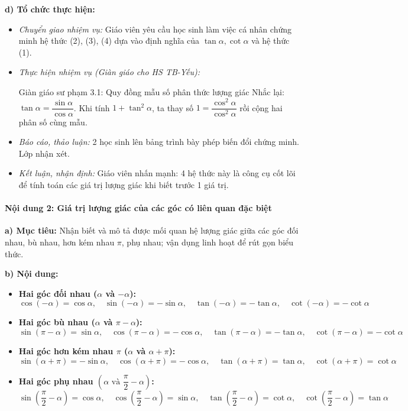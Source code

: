 \documentclass[12pt, a4paper]{article}
\begin{document}
\textbf{d) Tổ chức thực hiện:}
\begin{itemize}[leftmargin=0.6cm]
    \item \textit{Chuyển giao nhiệm vụ:} Giáo viên yêu cầu học sinh làm việc cá nhân chứng minh hệ thức (2), (3), (4) dựa vào định nghĩa của $\tan\alpha, \cot\alpha$ và hệ thức (1).
    \item \textit{Thực hiện nhiệm vụ (Giàn giáo cho HS TB-Yếu):}
    \begin{scaffoldbox}{Giàn giáo sư phạm 3.1: Quy đồng mẫu số phân thức lượng giác}
        Nhắc lại: $\tan\alpha = \dfrac{\sin\alpha}{\cos\alpha}$. Khi tính $1 + \tan^2\alpha$, ta thay số $1 = \dfrac{\cos^2\alpha}{\cos^2\alpha}$ rồi cộng hai phân số cùng mẫu.
    \end{scaffoldbox}
    \item \textit{Báo cáo, thảo luận:} 2 học sinh lên bảng trình bày phép biến đổi chứng minh. Lớp nhận xét.
    \item \textit{Kết luận, nhận định:} Giáo viên nhấn mạnh: 4 hệ thức này là công cụ cốt lõi để tính toán các giá trị lượng giác khi biết trước 1 giá trị.
\end{itemize}

\paragraph{Nội dung 2: Giá trị lượng giác của các góc có liên quan đặc biệt}
\textbf{a) Mục tiêu:} Nhận biết và mô tả được mối quan hệ lượng giác giữa các góc đối nhau, bù nhau, hơn kém nhau $\pi$, phụ nhau; vận dụng linh hoạt để rút gọn biểu thức.

\textbf{b) Nội dung:}
\begin{itemize}[leftmargin=0.6cm]
    \item \textbf{Hai góc đối nhau ($\alpha$ và $-\alpha$):}
    $$\cos(-\alpha) = \cos\alpha, \quad \sin(-\alpha) = -\sin\alpha, \quad \tan(-\alpha) = -\tan\alpha, \quad \cot(-\alpha) = -\cot\alpha$$
    \item \textbf{Hai góc bù nhau ($\alpha$ và $\pi - \alpha$):}
    $$\sin(\pi - \alpha) = \sin\alpha, \quad \cos(\pi - \alpha) = -\cos\alpha, \quad \tan(\pi - \alpha) = -\tan\alpha, \quad \cot(\pi - \alpha) = -\cot\alpha$$
    \item \textbf{Hai góc hơn kém nhau $\pi$ ($\alpha$ và $\alpha + \pi$):}
    $$\sin(\alpha + \pi) = -\sin\alpha, \quad \cos(\alpha + \pi) = -\cos\alpha, \quad \tan(\alpha + \pi) = \tan\alpha, \quad \cot(\alpha + \pi) = \cot\alpha$$
    \item \textbf{Hai góc phụ nhau $\left(\alpha \text{ và } \dfrac{\pi}{2} - \alpha\right)$:}
    $$\sin\left(\dfrac{\pi}{2} - \alpha\right) = \cos\alpha, \quad \cos\left(\dfrac{\pi}{2} - \alpha\right) = \sin\alpha, \quad \tan\left(\dfrac{\pi}{2} - \alpha\right) = \cot\alpha, \quad \cot\left(\dfrac{\pi}{2} - \alpha\right) = \tan\alpha$$
\end{itemize}
\end{document}
